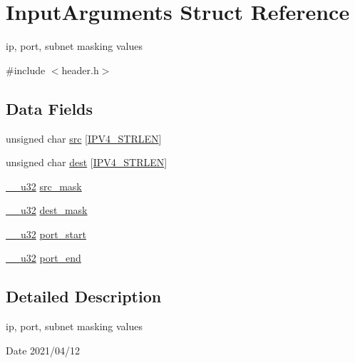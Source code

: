 \hypertarget{struct_input_arguments}{}\section{Input\+Arguments Struct Reference}
\label{struct_input_arguments}


ip, port, subnet masking values  




{\ttfamily \#include $<$header.\+h$>$}

\subsection*{Data Fields}
\begin{DoxyCompactItemize}
\item 
unsigned char \hyperlink{struct_input_arguments_a70b9300e7d151f7aadcba8a1c81f3fd9}{src} \mbox{[}\hyperlink{header_8h_ad5057f0ae40bc5ff36e7c9e65ea6c457}{I\+P\+V4\+\_\+\+S\+T\+R\+L\+EN}\mbox{]}
\item 
unsigned char \hyperlink{struct_input_arguments_a2fbdfdcfd2976c224421d481d0935d8d}{dest} \mbox{[}\hyperlink{header_8h_ad5057f0ae40bc5ff36e7c9e65ea6c457}{I\+P\+V4\+\_\+\+S\+T\+R\+L\+EN}\mbox{]}
\item 
\hyperlink{asm__types_8h_a3acae9310e2c2e411e800a8a369171c6}{\+\_\+\+\_\+u32} \hyperlink{struct_input_arguments_a4fc0f7b36bc43c7590cb0843282368aa}{src\+\_\+mask}
\item 
\hyperlink{asm__types_8h_a3acae9310e2c2e411e800a8a369171c6}{\+\_\+\+\_\+u32} \hyperlink{struct_input_arguments_a63b8e9efc215ebefa3d898701531e296}{dest\+\_\+mask}
\item 
\hyperlink{asm__types_8h_a3acae9310e2c2e411e800a8a369171c6}{\+\_\+\+\_\+u32} \hyperlink{struct_input_arguments_a5465bae0b80139c3aab02aadda37a2ec}{port\+\_\+start}
\item 
\hyperlink{asm__types_8h_a3acae9310e2c2e411e800a8a369171c6}{\+\_\+\+\_\+u32} \hyperlink{struct_input_arguments_ac3c6eeaeb713047db039592d5c1f0f01}{port\+\_\+end}
\end{DoxyCompactItemize}


\subsection{Detailed Description}
ip, port, subnet masking values 

\begin{DoxyDate}{Date}
2021/04/12 
\end{DoxyDate}


